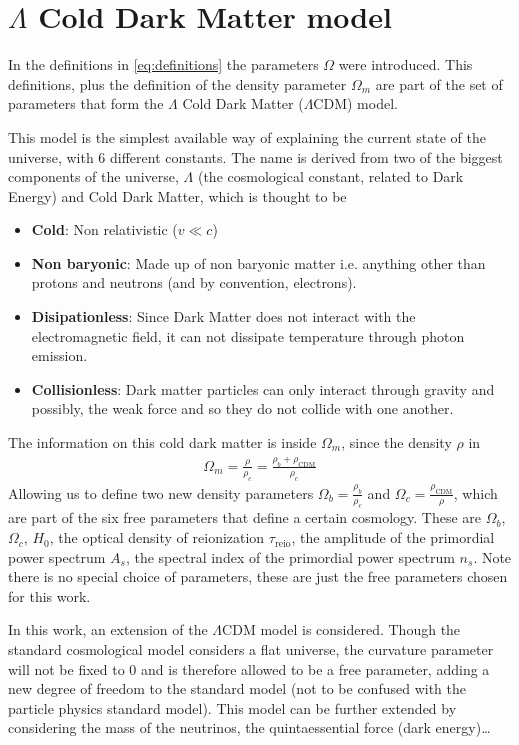 \section{$\Lambda$ Cold Dark Matter model}
\label{sec:LCDM}

In the definitions in \eqref{eq:definitions} the parameters $\Omega$ were introduced. This definitions, plus the definition of the density parameter $\Omega_m$ are part of the set of parameters that form the $\Lambda$ Cold Dark Matter ($\Lambda$CDM) model.

This model is the simplest available way of explaining the current state of the universe, with 6 different constants. The name is derived from two of the biggest components of the universe, $\Lambda$ (the cosmological constant, related to Dark Energy) and Cold Dark Matter, which is thought to be
\begin{itemize}
	\item \textbf{Cold}: Non relativistic ($v \ll c$)
	\item \textbf{Non baryonic}: Made up of non baryonic matter i.e. anything other than protons and neutrons (and by convention, electrons).
	\item \textbf{Disipationless}: Since Dark Matter does not interact with the electromagnetic field, it can not dissipate temperature through photon emission.
	\item \textbf{Collisionless}: Dark matter particles can only interact through gravity and possibly, the weak force and so they do not collide with one another.
\end{itemize}
The information on this cold dark matter is inside $\Omega_m$, since the density $\rho$ in
\begin{align}
	\Omega_m = \frac{\rho}{\rho_c} = \frac{\rho_b + \rho_{\text{CDM}}}{\rho_c}
\end{align}
Allowing us to define two new density parameters $\Omega_b = \frac{\rho_b}{\rho_c}$ and $\Omega_c =  \frac{\rho_\text{CDM}}{\rho}$, which are part of the six free parameters that define a certain cosmology. These are $\Omega_b$, $\Omega_c$, $H_0$, the optical density of reionization $\tau_{\text{reio}}$, the amplitude of the primordial power spectrum $A_s$, the spectral index of the primordial power spectrum $n_s$. Note there is no special choice of parameters, these are just the free parameters chosen for this work.

In this work, an extension of the $\Lambda$CDM model is considered. Though the standard cosmological model considers a flat universe, the curvature parameter will not be fixed to $0$ and is therefore allowed to be a free parameter, adding a new degree of freedom to the standard model (not to be confused with the particle physics standard model). This model can be further extended by considering the mass of the neutrinos, the quintaessential force (dark energy)\ldots 

